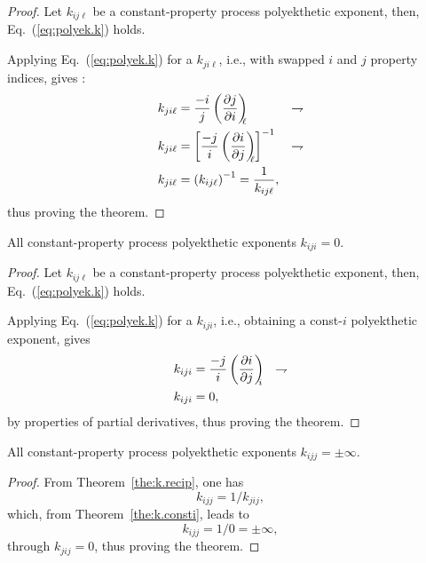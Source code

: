     \begin{proof}
        Let  $k_{ij\ell}$  be  a  constant-property   process   polyekthetic   exponent,   then,
        Eq.~(\ref{eq:polyek.k}) holds.

        Applying Eq.~(\ref{eq:polyek.k}) for a $k_{ji\ell}$, i.e.,  with  swapped  $i$  and  $j$
        property indices, gives :
        \begin{align}
            k_{ji\ell} &= \frac{-i}{j} \left(\frac{\partial {{j}}}{\partial {{i}}}\right)_{\!\!\!{\ell}}
                       & \rightharpoondown\\
            k_{ji\ell} &= \left[\frac{-j}{i} \left(\frac{\partial {{i}}}{\partial {{j}}}\right)_{\!\!\!{\ell}}\right]^{-1}
                       & \rightharpoondown\\
            k_{ji\ell} &= \left(k_{ij\ell}\right)^{-1} = \frac{1}{k_{ij\ell}},
        \end{align}
        \noindent thus proving the theorem.
    \end{proof}

    \begin{theorem}\label{the:k.consti}
        All constant-property process polyekthetic exponents $k_{iji} = 0$.
    \end{theorem}

    \begin{proof}
        Let  $k_{ij\ell}$  be  a  constant-property   process   polyekthetic   exponent,   then,
        Eq.~(\ref{eq:polyek.k}) holds.

        Applying  Eq.~(\ref{eq:polyek.k})  for  a  $k_{iji}$,  i.e.,   obtaining   a   const-$i$
        polyekthetic exponent, gives
        \begin{align}
            k_{iji} &= \frac{-j}{i} \left(\frac{\partial {{i}}}{\partial {{j}}}\right)_{\!\!\!{i}}
                    & \rightharpoondown\\
            k_{iji} &= 0,
        \end{align}
        \noindent by properties of partial derivatives, thus proving the theorem.
    \end{proof}

    \begin{theorem}\label{the:k.constj}
        All constant-property process polyekthetic exponents $k_{ijj} = \pm\infty$.
    \end{theorem}

    \begin{proof}
        From Theorem~\ref{the:k.recip}, one has
        \begin{equation}
            k_{ijj} = 1 / k_{jij},
        \end{equation}
        \noindent which, from Theorem~\ref{the:k.consti}, leads to
        \begin{equation}
            k_{ijj} = 1 / 0 = \pm\infty,
        \end{equation}
        \noindent through $k_{jij} = 0$, thus proving the theorem.
    \end{proof}

